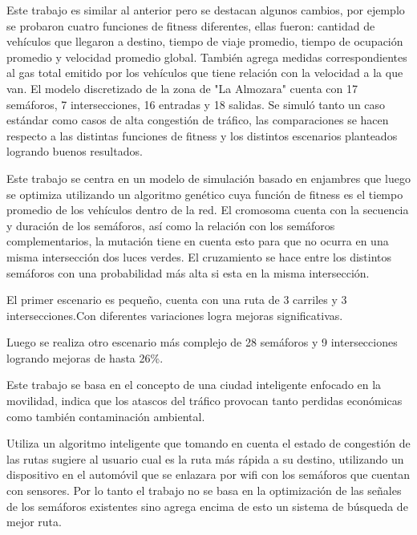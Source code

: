 \begin{itemize}
	\begin{item}
		Este trabajo es similar al anterior pero se destacan algunos cambios, por ejemplo se probaron cuatro funciones de fitness diferentes, ellas fueron: cantidad de vehículos que llegaron a destino, tiempo de viaje promedio, tiempo de ocupación promedio y velocidad promedio global.
		También agrega medidas correspondientes al gas total emitido por los vehículos que tiene relación con la velocidad a la que van.
		El modelo discretizado de la zona de "La Almozara" cuenta con 17 semáforos, 7 intersecciones, 16 entradas y 18 salidas.
		Se simuló tanto un caso estándar como casos de alta congestión de tráfico, las comparaciones se hacen respecto a las distintas funciones de fitness y los distintos escenarios planteados logrando buenos resultados.
		
	\end{item}
	
	
	\begin{item}
		\bibentry{Penner2002}
		Este trabajo se centra en un modelo de simulación basado en enjambres que luego se optimiza utilizando un algoritmo genético cuya función de fitness es el tiempo promedio de los vehículos dentro de la red. El cromosoma cuenta con la secuencia y duración de los semáforos, así como la relación con los semáforos complementarios, la mutación tiene en cuenta esto para que no ocurra en una misma intersección dos luces verdes. El cruzamiento se hace entre los distintos semáforos con una probabilidad más alta si esta en la misma intersección.
		
		El primer escenario es pequeño, cuenta con una ruta de 3 carriles y 3 intersecciones.Con diferentes variaciones logra mejoras significativas.
		
		Luego se realiza otro escenario más complejo de 28 semáforos y 9 intersecciones logrando mejoras de hasta 26\%.
	\end{item}	
	
	
	\begin{item}
		\bibentry{Stolfi2012}
		Este trabajo se basa en el concepto de una ciudad inteligente enfocado en la movilidad, indica que los atascos del tráfico provocan tanto perdidas económicas como también contaminación ambiental.
		
		Utiliza un algoritmo inteligente que tomando en cuenta el estado de congestión de las rutas sugiere al usuario cual es la ruta más rápida a su destino, utilizando un dispositivo en el automóvil que se enlazara por wifi con los semáforos que cuentan con sensores. Por lo tanto el trabajo no se basa en la optimización de las señales de los semáforos existentes sino agrega encima de esto un sistema de búsqueda de mejor ruta.
		

\end{item}
\end{itemize}
